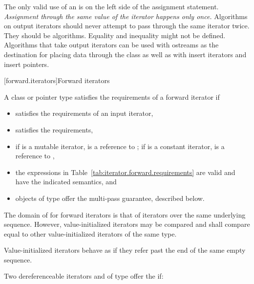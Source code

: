 \pnum
\begin{note}
The only valid use of an
is on the left side of the assignment statement.
\textit{Assignment through the same value of the iterator happens only once.}
Algorithms on output iterators should never attempt to pass through the same iterator twice.
They should be
algorithms.
Equality and inequality might not be defined.
Algorithms that take output iterators can be used with ostreams as the destination
for placing data through the
class as well as with insert iterators and insert pointers.
\end{note}

[forward.iterators]{Forward iterators}

\pnum
A class or pointer type
satisfies the requirements of a forward iterator if

\begin{itemize}
\item {} satisfies the requirements of an input iterator,

\item {} satisfies the 
requirements,

\item if  is a mutable iterator,  is a reference to ;
if  is a constant iterator,  is a reference to ,

\item the expressions in Table~\ref{tab:iterator.forward.requirements}
are valid and have the indicated semantics, and

\item objects of type  offer the multi-pass guarantee, described below.
\end{itemize}

\pnum
The domain of \tcode{==} for forward iterators is that of iterators over the same
underlying sequence. However, value-initialized iterators may be compared and
shall compare equal to other value-initialized iterators of the same type.
\begin{note} Value-initialized iterators behave as if they refer past the end of
the same empty sequence. \end{note}

\pnum
Two dereferenceable iterators  and  of type  offer the
 if:

